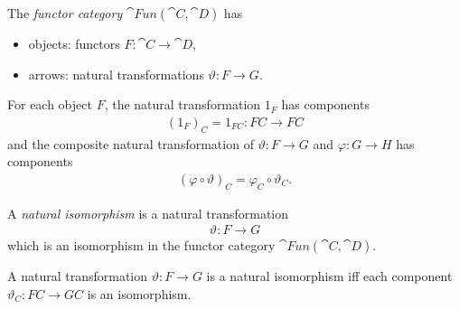 \documentclass{article}
\begin{document}
\begin{definition}[Awodey p. 158]
    The \emph{functor category} $\cat{Fun}(\cat C, \cat D)$ has
    \begin{itemize}
        \item objects: functors $F:\cat C \to \cat D$,
        \item arrows: natural transformations $\vartheta:F\to G$.
    \end{itemize} 
    For each object $F$, the natural transformation $1_F$ has components
    \begin{align*}
        (1_F)_C = 1_{FC}:FC\to FC
    \end{align*}
    and the composite natural transformation of $\vartheta:F\to G$ and
    $\varphi:G\to H$ has components
    \begin{align*}
        (\varphi\circ\vartheta)_C=\varphi_C\circ\vartheta_C.
    \end{align*}
\end{definition}

\begin{definition}[Awodey p. 158]
    A \emph{natural isomorphism} is a natural transformation
    \begin{align*}
        \vartheta: F\to G
    \end{align*} 
    which is an isomorphism in the functor category $\cat{Fun}(\cat C, \cat D)$.
\end{definition}

\begin{lemma}[Awodey p. 159]
    A natural transformation $\vartheta:F\to G$ is a natural isomorphism
    iff each component $\vartheta_C:FC\to GC$ is an isomorphism. 
\end{lemma}
\end{document}
